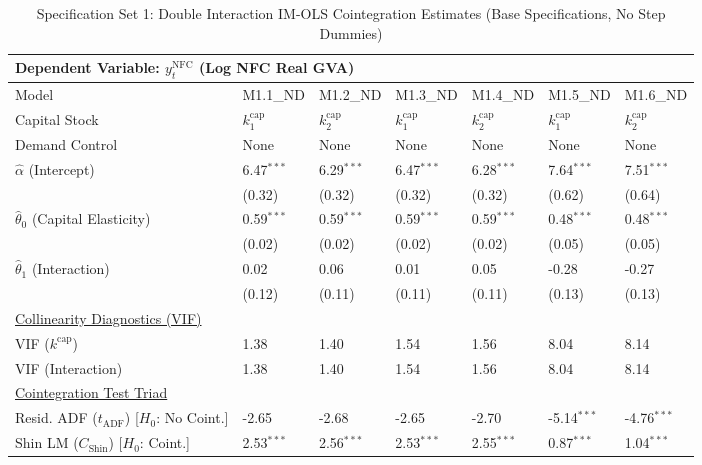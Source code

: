 \begin{table}[H]
\centering
\caption{Specification Set 1: Double Interaction IM-OLS Cointegration Estimates (Base Specifications, No Step Dummies)}
\label{tab:spec_set_1_nd}
\scriptsize
\begin{tabular}{p{3.8cm}p{1.35cm}p{1.35cm}p{1.35cm}p{1.35cm}p{1.35cm}p{1.35cm}}
\toprule
\multicolumn{7}{l}{\textbf{Dependent Variable: $y_t^{\text{NFC}}$ (Log NFC Real GVA)}} \\
\midrule
Model & M1.1\_ND & M1.2\_ND & M1.3\_ND & M1.4\_ND & M1.5\_ND & M1.6\_ND  \\
Capital Stock & $k^{\text{cap}}_1$ & $k^{\text{cap}}_2$ & $k^{\text{cap}}_1$ & $k^{\text{cap}}_2$ & $k^{\text{cap}}_1$ & $k^{\text{cap}}_2$  \\
Demand Control & None & None & None & None & None & None  \\
\midrule
$\hat{\alpha}$ (Intercept)  & 6.47$^{***}$ & 6.29$^{***}$ & 6.47$^{***}$ & 6.28$^{***}$ & 7.64$^{***}$ & 7.51$^{***}$  \\
 & {\scriptsize (0.32)} & {\scriptsize (0.32)} & {\scriptsize (0.32)} & {\scriptsize (0.32)} & {\scriptsize (0.62)} & {\scriptsize (0.64)}  \\
[1ex]
$\hat{\theta}_0$ (Capital Elasticity)  & 0.59$^{***}$ & 0.59$^{***}$ & 0.59$^{***}$ & 0.59$^{***}$ & 0.48$^{***}$ & 0.48$^{***}$  \\
 & {\scriptsize (0.02)} & {\scriptsize (0.02)} & {\scriptsize (0.02)} & {\scriptsize (0.02)} & {\scriptsize (0.05)} & {\scriptsize (0.05)}  \\
$\hat{\theta}_1$ (Interaction)  & 0.02 & 0.06 & 0.01 & 0.05 & -0.28 & -0.27  \\
 & {\scriptsize (0.12)} & {\scriptsize (0.11)} & {\scriptsize (0.11)} & {\scriptsize (0.11)} & {\scriptsize (0.13)} & {\scriptsize (0.13)}  \\
\midrule
\multicolumn{7}{l}{\underline{Collinearity Diagnostics (VIF)}} \\
VIF ($k^{\text{cap}}$) & 1.38 & 1.40 & 1.54 & 1.56 & 8.04 & 8.14  \\
VIF (Interaction) & 1.38 & 1.40 & 1.54 & 1.56 & 8.04 & 8.14  \\
\midrule
\multicolumn{7}{l}{\underline{Cointegration Test Triad}} \\
\makecell[l]{Resid. ADF ($t_{\text{ADF}}$) \\ {\scriptsize [$H_0$: No Coint.]}} & -2.65 & -2.68 & -2.65 & -2.70 & -5.14$^{***}$ & -4.76$^{***}$  \\
\makecell[l]{Shin LM ($C_{\text{Shin}}$) \\ {\scriptsize [$H_0$: Coint.]}} & 2.53$^{***}$ & 2.56$^{***}$ & 2.53$^{***}$ & 2.55$^{***}$ & 0.87$^{***}$ & 1.04$^{***}$  \\

\end{tabular}
\end{table}
